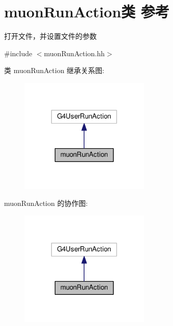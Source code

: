 \hypertarget{classmuonRunAction}{}\section{muon\+Run\+Action类 参考}
\label{classmuonRunAction}


打开文件，并设置文件的参数  




{\ttfamily \#include $<$muon\+Run\+Action.\+hh$>$}



类 muon\+Run\+Action 继承关系图\+:\nopagebreak
\begin{figure}[H]
\begin{center}
\leavevmode
\includegraphics[width=176pt]{classmuonRunAction__inherit__graph}
\end{center}
\end{figure}


muon\+Run\+Action 的协作图\+:\nopagebreak
\begin{figure}[H]
\begin{center}
\leavevmode
\includegraphics[width=176pt]{classmuonRunAction__coll__graph}
\end{center}
\end{figure}
